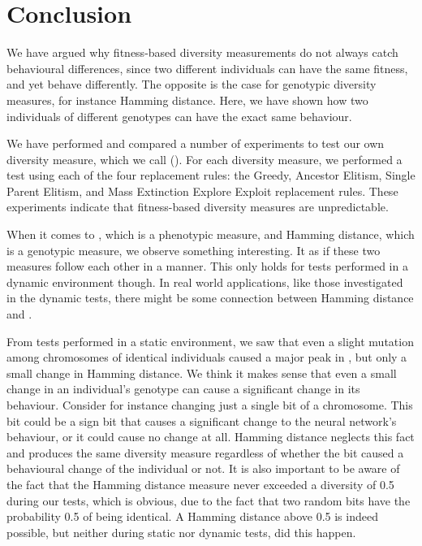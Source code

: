 \section{Conclusion}\label{sec:conclusion}
We have argued why fitness-based diversity measurements do not always catch behavioural differences, since two different individuals can have the same fitness, and yet behave differently.
The opposite is the case for genotypic diversity measures, for instance Hamming distance.
Here, we have shown how two individuals of different genotypes can have the exact same behaviour.

We have performed and compared a number of experiments to test our own diversity measure, which we call \di{} (\dia{}).
For each diversity measure, we performed a test using each of the four replacement rules: the Greedy, Ancestor Elitism, Single Parent Elitism, and Mass Extinction Explore Exploit replacement rules. These experiments indicate that fitness-based diversity measures are unpredictable.

When it comes to \dia{}, which is a phenotypic measure, and Hamming distance, which is a genotypic measure, we observe something interesting. It as if these two measures follow each other in a manner.
This only holds for tests performed in a dynamic environment though. 
In real world applications, like those investigated in the dynamic tests, there might be some connection between Hamming distance and \dia{}.

From tests performed in a static environment, we saw that even a slight mutation among chromosomes of identical individuals caused a major peak in \dia{}, but only a small change in Hamming distance.
We think it makes sense that even a small change in an individual's genotype can cause a significant change in its behaviour. Consider for instance changing just a single bit of a chromosome. This bit could be a sign bit that causes a significant change to the neural network's behaviour, or it could cause no change at all.
Hamming distance neglects this fact and produces the same diversity measure regardless of whether the bit caused a behavioural change of the individual or not.
It is also important to be aware of the fact that the Hamming distance measure never exceeded a diversity of \num{0.5} during our tests, which is obvious, due to the fact that two random bits have the probability \num{0.5} of being identical.
A Hamming distance above \num{0.5} is indeed possible, but neither during static nor dynamic tests, did this happen. 

